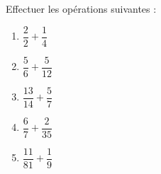 
\begin{exercice}\label{exosmath-0870}

Effectuer les opérations suivantes :
\begin{multicols}{3}
    \begin{enumerate}
        \item
            \( \dfrac{  2  }{ 2 }+\dfrac{  1  }{ 4 }\) 
        \item
            \( \dfrac{  5  }{ 6 }+\dfrac{  5  }{ 12 }\) 
        \item
            \( \dfrac{  13  }{ 14 }+\dfrac{  5  }{ 7 }\) 
        \item
            \( \dfrac{  6  }{ 7 }+\dfrac{  2  }{ 35 }\) 
        \item
            \( \dfrac{  11  }{ 81 }+\dfrac{  1  }{ 9 }\) 
    \end{enumerate}
\end{multicols}

\end{exercice}
